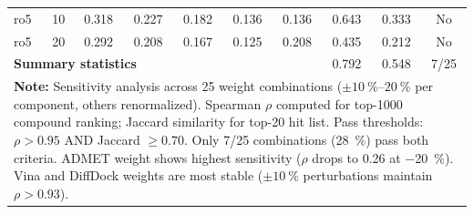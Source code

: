\documentclass[journal=jcisd8,manuscript=suppinfo]{achemso}
\begin{document}
\begin{table}[!htbp]
\begin{tabular}{lccccccccc}
ro5 & \num{+10} & \num{0.318} & \num{0.227} & \num{0.182} & \num{0.136} & \num{0.136} & \num{0.643} & \num{0.333} & No \\
ro5 & \num{+20} & \num{0.292} & \num{0.208} & \num{0.167} & \num{0.125} & \num{0.208} & \num{0.435} & \num{0.212} & No \\
\midrule
\multicolumn{7}{l}{\textbf{Summary statistics}} & \num{0.792} & \num{0.548} & \num{7}/\num{25} \\
\bottomrule
\multicolumn{10}{p{16cm}}{
\noindent\textbf{Note:} Sensitivity analysis across \num{25} weight combinations ($\pm \qtyrange{10}{20}{\percent}$ per component, others renormalized).
Spearman $\rho$ computed for top-\num{1000} compound ranking; Jaccard similarity for top-\num{20} hit list.
Pass thresholds: $\rho > \num{0.95}$ AND Jaccard $\geq \num{0.70}$. Only \num{7}/\num{25} combinations (\qty{28}{\percent}) pass both criteria.
ADMET weight shows highest sensitivity ($\rho$ drops to \num{0.26} at \qty{-20}{\percent}). Vina and DiffDock weights
are most stable ($\pm \qty{10}{\percent}$ perturbations maintain $\rho > \num{0.93}$).}
\end{tabular}
\end{table}
\end{document}
